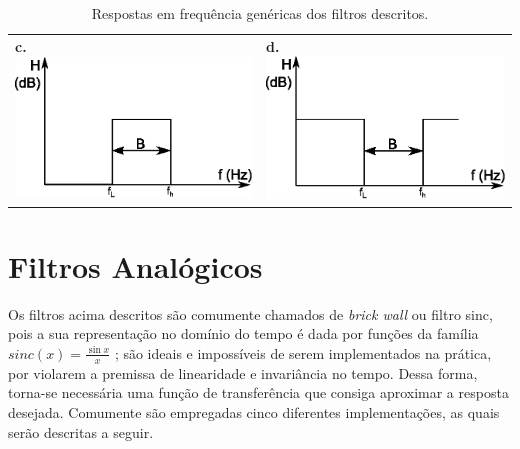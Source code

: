 \begin{table}[h]
\begin{tabular}{ll}
\textbf{c.} \includegraphics[scale=0.7]{images/bandpass_generic}  & \textbf{d.} \includegraphics[scale=0.7]{images/bandstop_generic} 
\end{tabular}
\caption{Respostas em frequência genéricas dos filtros descritos.}
\label{table:filter_generic_freq_response}

\end{table}

\section{Filtros Analógicos}
\label{sec:analog_filters}
Os filtros acima descritos são comumente chamados de \textit{brick wall} ou filtro sinc, pois a sua representação no domínio do tempo é dada por funções da família $sinc(x) = \frac{\sin x}{x}$ \cite{haykin}; são ideais e impossíveis de serem implementados na prática, por violarem a premissa de linearidade e invariância no tempo. Dessa forma, torna-se necessária uma função de transferência que consiga aproximar a resposta desejada. Comumente são empregadas cinco diferentes implementações, as quais serão descritas a seguir.

